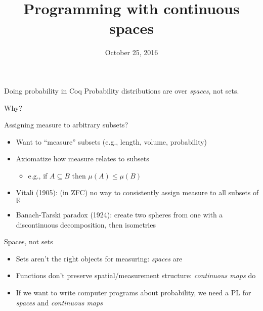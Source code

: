 \documentclass[14pt]{beamer}
\title{Programming with continuous spaces}
\date{October 25, 2016}
\newcommand{\R}{\mathbb{R}}
\begin{document}
\maketitle

\begin{frame}{Doing probability in Coq}
Probability distributions are over \emph{spaces}, not sets.

\bigskip
\pause

\begin{center}
\Huge Why?
\end{center}

\end{frame}

\begin{frame}{Assigning measure to arbitrary subsets?}

\begin{itemize}
\item Want to ``measure'' subsets (e.g., length, volume, probability)
\pause
\item Axiomatize how measure relates to subsets
\begin{itemize}
\item e.g., if $A \subseteq B$ then $\mu(A) \le \mu(B)$
\end{itemize}
\pause
\item Vitali (1905): (in ZFC) no way to consistently assign measure to all subsets of $\R$
\pause
\item Banach-Tarski paradox (1924): create two spheres from one with a discontinuous decomposition, then isometries
\end{itemize}
\end{frame}

\begin{frame}{Spaces, not sets}
\begin{itemize}
\item Sets aren't the right objects for measuring: \emph{spaces} are
\item Functions don't preserve spatial/measurement structure: \emph{continuous maps} do
\item If we want to write computer programs about probability, we need a PL for \emph{spaces} and \emph{continuous maps}
\end{itemize}
\end{frame}
\end{document}
